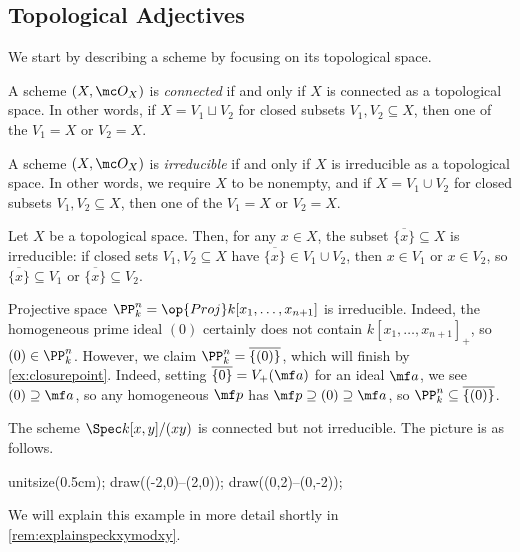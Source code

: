 \documentclass[../notes.tex]{subfiles}
\begin{document}
\subsection{Topological Adjectives}
We start by describing a scheme by focusing on its topological space.
\begin{definition}[Connected]
	A scheme $(X,\mc O_X)$ is \textit{connected} if and only if $X$ is connected as a topological space. In other words, if $X=V_1\sqcup V_2$ for closed subsets $V_1,V_2\subseteq X$, then one of the $V_1=X$ or $V_2=X$.
\end{definition}
\begin{definition}[Irreducible]
	A scheme $(X,\mc O_X)$ is \textit{irreducible} if and only if $X$ is irreducible as a topological space. In other words, we require $X$ to be nonempty, and if $X=V_1\cup V_2$ for closed subsets $V_1,V_2\subseteq X$, then one of the $V_1=X$ or $V_2=X$.
\end{definition}
\begin{example} \label{ex:closurepoint}
	Let $X$ be a topological space. Then, for any $x\in X$, the subset $\overline{\{x\}}\subseteq X$ is irreducible: if closed sets $V_1,V_2\subseteq X$ have $\overline{\{x\}}\in V_1\cup V_2$, then $x\in V_1$ or $x\in V_2$, so $\overline{\{x\}}\subseteq V_1$ or $\overline{\{x\}}\subseteq V_2$.
\end{example}
\begin{example} \label{ex:proj-is-irred}
	Projective space $\PP^n_k=\op{Proj}k[x_1,\ldots,x_{n+1}]$ is irreducible. Indeed, the homogeneous prime ideal $(0)$ certainly does not contain $k[x_1,\ldots,x_{n+1}]_+$, so $(0)\in\PP^n_k$. However, we claim $\PP^n_k=\overline{\{(0)\}}$, which will finish by \autoref{ex:closurepoint}. Indeed, setting $\overline{\{0\}}=V_+(\mf a)$ for an ideal $\mf a$, we see $(0)\supseteq\mf a$, so any homogeneous $\mf p$ has $\mf p\supseteq(0)\supseteq\mf a$, so $\PP^n_k\subseteq\overline{\{(0)\}}$.
\end{example}
\begin{nex} \label{nex:speckxymodxy}
	The scheme $\Spec k[x,y]/(xy)$ is connected but not irreducible. The picture is as follows.
	\begin{center}
		\begin{asy}
			unitsize(0.5cm);
			draw((-2,0)--(2,0));
			draw((0,2)--(0,-2));
		\end{asy}
	\end{center}
	We will explain this example in more detail shortly in \autoref{rem:explainspeckxymodxy}.
\end{nex}
\end{document}
